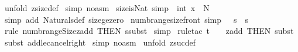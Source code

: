 \begin{isabellebody}
\isamarkupfalse%
\ {\isacharparenleft}unfold\ zsize{\isacharunderscore}def{\isacharparenright}\isanewline
{}\isamarkupfalse%
\ {\isacharparenleft}simp\ {\isacharparenleft}no{\isacharunderscore}asm{\isacharparenright}{\isacharparenright}\isanewline
{}\isamarkupfalse%
%
\endisatagproof
{\isafoldproof}%
%
\isadelimproof
\isanewline
%
\endisadelimproof
\isanewline
\isanewline
\isanewline
{}\isamarkupfalse%
\ size{\isacharunderscore}is{\isacharunderscore}Nat\ {\isacharbrackleft}simp{\isacharbrackright}{\isacharcolon}\ {\isachardoublequoteopen}\ int\ x\ {\isacharcolon}\ {\isacharpercent}N\ {\isachardoublequoteclose}\isanewline
%
\isadelimproof
%
\endisadelimproof
%
\isatagproof
{}\isamarkupfalse%
\ {\isacharparenleft}simp\ add{\isacharcolon}\ Naturals{\isacharunderscore}def\ size{\isacharunderscore}ge{\isacharunderscore}zero{\isacharparenright}\isanewline
{}\isamarkupfalse%
%
\endisatagproof
{\isafoldproof}%
%
\isadelimproof
\isanewline
%
\endisadelimproof
\isanewline
\isanewline
{}\isamarkupfalse%
\ numb{\isacharunderscore}range{\isacharunderscore}size{\isacharunderscore}front\ {\isacharbrackleft}simp{\isacharbrackright}{\isacharcolon}\ {\isachardoublequoteopen}{\isacharhash}{\isacharparenleft}{}\ {\isachardot}{\isachardot}\ {\isacharhash}s{\isacharparenright}\ {\isacharequal}\ {\isacharhash}s{\isachardoublequoteclose}\isanewline
%
\isadelimproof
%
\endisadelimproof
%
\isatagproof
{}\isamarkupfalse%
\ {\isacharparenleft}rule\ numb{\isacharunderscore}range{\isacharunderscore}Size{\isacharunderscore}zadd\ {\isacharbrackleft}THEN\ ssubst{\isacharbrackright}{\isacharparenright}\isanewline
{}\isamarkupfalse%
\ simp\isanewline
{}\isamarkupfalse%
\ {\isacharparenleft}rule{\isacharunderscore}tac\ t\ {\isacharequal}\ {\isachardoublequoteopen}{}{\isachardoublequoteclose}\ \ zadd{\isacharunderscore}{}\ {\isacharbrackleft}THEN\ subst{\isacharbrackright}{\isacharparenright}\isanewline
{}\isamarkupfalse%
\isanewline
{}\isamarkupfalse%
\isanewline
{}\isamarkupfalse%
\ {\isacharparenleft}subst\ add{\isacharunderscore}le{\isacharunderscore}cancel{\isacharunderscore}right{\isacharparenright}\isanewline
{}\isamarkupfalse%
\ {\isacharparenleft}simp\ {\isacharparenleft}no{\isacharunderscore}asm{\isacharparenright}{\isacharparenright}\isanewline
{}\isamarkupfalse%
\ {\isacharparenleft}unfold\ zsuc{\isacharunderscore}def{\isacharparenright}\isanewline

\end{isabellebody}
